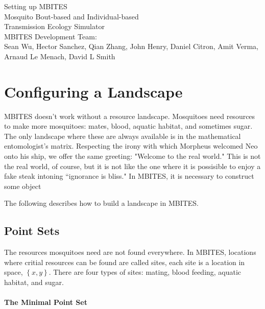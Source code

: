\documentclass{article}
\begin{document}


\begin{centering}
\huge{Setting up MBITES}\\
\vspace{0.3in}
\Large{Mosquito Bout-based and Individual-based \\ Transmission Ecology Simulator}\\
\vspace{0.3in}
\large{MBITES Development Team: \\ Sean Wu, Hector Sanchez, Qian Zhang, John Henry, Daniel Citron, Amit Verma, Arnaud Le Menach, David L Smith\\}

\end{centering}

\vspace{0.3in}

\section{Configuring a Landscape} 

MBITES doesn't work without a resource landscape. Mosquitoes need resources to make more mosquitoes: mates, blood, aquatic habitat, and sometimes sugar. The only landscape where these are always available is in the mathematical entomologist's matrix. Respecting the irony with which Morpheus welcomed Neo onto his ship, we offer the same greeting: "Welcome to the real world." This is not the real world, of course, but it is not like the one where it is possisible to enjoy a fake steak intoning ``ignorance is bliss." In MBITES, it is necessary to construct some object 

The following describes how to build a landscape in MBITES. 

\subsection{Point Sets}

The resources mosquitoes need are not found everywhere.  In MBITES, locations where critial resources can be found are called sites, each site is a location in space, $\left\{ x,y \right\}$. There are four types of sites: mating, blood feeding, aquatic habitat, and sugar.

\paragraph{The Minimal Point Set}
\end{document}
